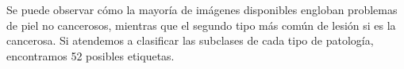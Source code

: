 Se puede observar cómo la mayoría de imágenes disponibles engloban problemas de piel no cancerosos, mientras que el segundo tipo más común de lesión si es la cancerosa. Si atendemos a clasificar las subclases de cada tipo de patología, encontramos 52 posibles etiquetas.





